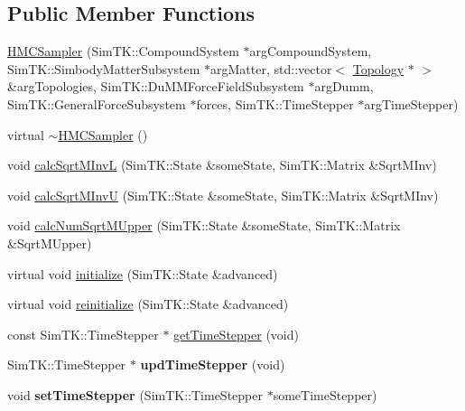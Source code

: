 \subsection*{Public Member Functions}
\begin{DoxyCompactItemize}
\item 
\hyperlink{classHMCSampler_abfc3165e0a559567e33bf19b8aea1a47}{H\+M\+C\+Sampler} (Sim\+T\+K\+::\+Compound\+System $\ast$arg\+Compound\+System, Sim\+T\+K\+::\+Simbody\+Matter\+Subsystem $\ast$arg\+Matter, std\+::vector$<$ \hyperlink{classTopology}{Topology} $\ast$ $>$ \&arg\+Topologies, Sim\+T\+K\+::\+Du\+M\+M\+Force\+Field\+Subsystem $\ast$arg\+Dumm, Sim\+T\+K\+::\+General\+Force\+Subsystem $\ast$forces, Sim\+T\+K\+::\+Time\+Stepper $\ast$arg\+Time\+Stepper)
\item 
virtual \hyperlink{classHMCSampler_a1781a161d1a712ed28c973b4b56c3c7f}{$\sim$\+H\+M\+C\+Sampler} ()
\item 
void \hyperlink{classHMCSampler_a1335bea08f96d449cb9bdb985b3e6b9d}{calc\+Sqrt\+M\+InvL} (Sim\+T\+K\+::\+State \&some\+State, Sim\+T\+K\+::\+Matrix \&Sqrt\+M\+Inv)
\item 
void \hyperlink{classHMCSampler_ab4f9446e1b9ecb3f47b62637e8bc6fb9}{calc\+Sqrt\+M\+InvU} (Sim\+T\+K\+::\+State \&some\+State, Sim\+T\+K\+::\+Matrix \&Sqrt\+M\+Inv)
\item 
void \hyperlink{classHMCSampler_ad47e283497806a105dac3c2b15127fbf}{calc\+Num\+Sqrt\+M\+Upper} (Sim\+T\+K\+::\+State \&some\+State, Sim\+T\+K\+::\+Matrix \&Sqrt\+M\+Upper)
\item 
virtual void \hyperlink{classHMCSampler_ad878471d3e5222758b2544f76affd79a}{initialize} (Sim\+T\+K\+::\+State \&advanced)
\item 
virtual void \hyperlink{classHMCSampler_a43a302d87e149bfa893a5952ec20941f}{reinitialize} (Sim\+T\+K\+::\+State \&advanced)
\item 
const Sim\+T\+K\+::\+Time\+Stepper $\ast$ \hyperlink{classHMCSampler_a90d64460a0b1b4e83e3c27db0b7681f0}{get\+Time\+Stepper} (void)
\item 
Sim\+T\+K\+::\+Time\+Stepper $\ast$ {\bfseries upd\+Time\+Stepper} (void)\hypertarget{classHMCSampler_a16ecb11f6a9943d42a63448acb4358c4}{}\label{classHMCSampler_a16ecb11f6a9943d42a63448acb4358c4}

\item 
void {\bfseries set\+Time\+Stepper} (Sim\+T\+K\+::\+Time\+Stepper $\ast$some\+Time\+Stepper)\hypertarget{classHMCSampler_a7d8cfa2e3ff72ede9e3136d3a709ad43}{}\label{classHMCSampler_a7d8cfa2e3ff72ede9e3136d3a709ad43}


\end{DoxyCompactItemize}
